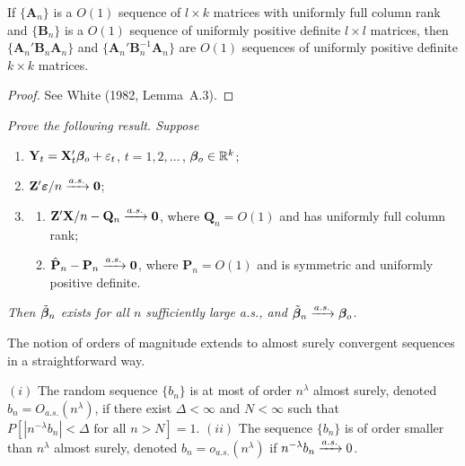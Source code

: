 \begin{lemma}\label{lem:upd}
If $\{\mathbf{A}_n\}$ is a $O(1)$ sequence of $l \times k$ matrices with uniformly
full column rank and $\{\mathbf{B}_n\}$ is a $O(1)$ sequence of uniformly positive definite
$l \times l$ matrices, then $\{\mathbf{A}_n'\mathbf{B}_n\mathbf{A}_n\}$ and $\{\mathbf{A}_n'\mathbf{B}_n^{-1}\mathbf{A}_n\}$ are $O(1)$ sequences of
uniformly positive definite $k \times k$ matrices.
\end{lemma}

\begin{proof}
See White (1982, Lemma~A.3).
\end{proof}

\begin{exercises}
\item\label{ex:2.20} \emph{Prove the following result. Suppose}
\begin{enumerate}[label=$(\roman*)$]
\item $\mathbf{Y}_t = \mathbf{X}_t'\boldsymbol{\beta}_o + \varepsilon_t$, \quad $t = 1, 2, \ldots$\,, $\boldsymbol{\beta}_o \in \mathbb{R}^k$;
\item $\mathbf{Z}'\boldsymbol{\varepsilon}/n \xrightarrow{a.s.} \mathbf{0}$;
\item[\emph{(iii)}] \begin{enumerate}[label=$(\alph*)$]
\item $\mathbf{Z}'\mathbf{X}/n - \mathbf{Q}_n \xrightarrow{a.s.} \mathbf{0}$, where $\mathbf{Q}_n = O(1)$ and has uniformly full
column rank;
\item $\hat{\mathbf{P}}_n - \mathbf{P}_n \xrightarrow{a.s.} \mathbf{0}$, where $\mathbf{P}_n = O(1)$ and is symmetric and uniformly
positive definite.
\end{enumerate}
\end{enumerate}
\emph{Then $\tilde{\boldsymbol{\beta}}_n$ exists for all $n$ sufficiently large a.s., and $\tilde{\boldsymbol{\beta}}_n \xrightarrow{a.s.} \boldsymbol{\beta}_o$.}
\end{exercises}

The notion of orders of magnitude extends to almost surely convergent
sequences in a straightforward way.

\begin{definition}\label{def:Oas-oas}
$(i)$ The random sequence $\{b_n\}$ is at most of order $n^{\lambda}$
almost surely, denoted $b_n = O_{a.s.}(n^{\lambda})$, if there exist $\Delta < \infty$ and $N < \infty$
such that $P[|n^{-\lambda}b_n| < \Delta \text{ for all } n > N] = 1$. $(ii)$ The sequence $\{b_n\}$ is of
order smaller than $n^{\lambda}$ almost surely, denoted $b_n = o_{a.s.}(n^{\lambda})$ if $n^{-\lambda}b_n \xrightarrow{a.s.} 0$.
\end{definition}

